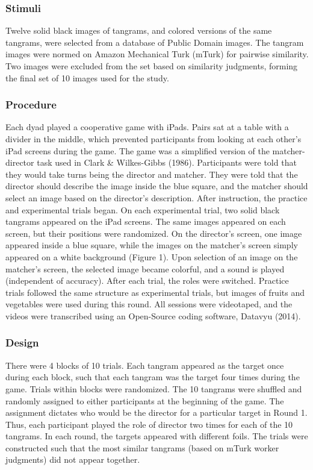 \documentclass[10pt, letterpaper]{article}
\begin{document}
\hypertarget{stimuli}{%
\subsubsection{Stimuli}\label{stimuli}}

Twelve solid black images of tangrams, and colored versions of the same
tangrams, were selected from a database of Public Domain images. The
tangram images were normed on Amazon Mechanical Turk (mTurk) for
pairwise similarity. Two images were excluded from the set based on
similarity judgments, forming the final set of 10 images used for the
study.

\hypertarget{procedure}{%
\subsubsection{Procedure}\label{procedure}}

Each dyad played a cooperative game with iPads. Pairs sat at a table
with a divider in the middle, which prevented participants from looking
at each other's iPad screens during the game. The game was a simplified
version of the matcher-director task used in Clark \& Wilkes-Gibbs
(1986). Participants were told that they would take turns being the
director and matcher. They were told that the director should describe
the image inside the blue square, and the matcher should select an image
based on the director's description. After instruction, the practice and
experimental trials began. On each experimental trial, two solid black
tangrams appeared on the iPad screens. The same images appeared on each
screen, but their positions were randomized. On the director's screen,
one image appeared inside a blue square, while the images on the
matcher's screen simply appeared on a white background (Figure 1). Upon
selection of an image on the matcher's screen, the selected image became
colorful, and a sound is played (independent of accuracy). After each
trial, the roles were switched. Practice trials followed the same
structure as experimental trials, but images of fruits and vegetables
were used during this round. All sessions were videotaped, and the
videos were transcribed using an Open-Source coding software, Datavyu
(2014).

\hypertarget{design}{%
\subsubsection{Design}\label{design}}

There were 4 blocks of 10 trials. Each tangram appeared as the target
once during each block, such that each tangram was the target four times
during the game. Trials within blocks were randomized. The 10 tangrams
were shuffled and randomly assigned to either participants at the
beginning of the game. The assignment dictates who would be the director
for a particular target in Round 1. Thus, each participant played the
role of director two times for each of the 10 tangrams. In each round,
the targets appeared with different foils. The trials were constructed
such that the most similar tangrams (based on mTurk worker judgments)
did not appear together.
\end{document}
